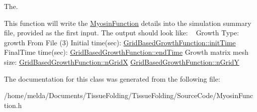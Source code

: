 The. 

This function will write the \hyperlink{classMyosinFunction}{Myosin\+Function} details into the simulation summary file, provided as the first input. The output should look like\+: ~\newline
 Growth Type\+: growth From File (3) Initial time(sec)\+: \hyperlink{classGrowthFunctionBase_ae92513a7b41637df8e26e7db35ddf97c}{Grid\+Based\+Growth\+Function\+::init\+Time} Final\+Time time(sec)\+: \hyperlink{classGrowthFunctionBase_a3ff4db0573d354a75666a5f3ca446941}{Grid\+Based\+Growth\+Function\+::end\+Time} Growth matrix mesh size\+: \hyperlink{classGridBasedGrowthFunction_af872b9963f3a579dcd615c23bcb58a86}{Grid\+Based\+Growth\+Function\+::n\+Grid\+X} \hyperlink{classGridBasedGrowthFunction_a625bc963a1f1e7d1f1a35dbd0ef51728}{Grid\+Based\+Growth\+Function\+::n\+Grid\+Y}

The documentation for this class was generated from the following file\+:\begin{DoxyCompactItemize}
\item 
/home/melda/\+Documents/\+Tissue\+Folding/\+Tissue\+Folding/\+Source\+Code/Myosin\+Function.\+h\end{DoxyCompactItemize}
